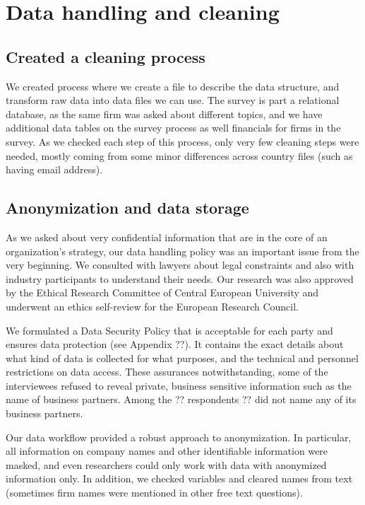 \documentclass[final, dvipsnames, authoryear,12pt]{elsarticle}
\begin{document}
\section{Data handling and cleaning}

\subsection{Created a cleaning process}

We created process where we create a file to describe the data structure, and transform raw data into data files we can use. The survey is part a relational database, as the same firm was asked about different topics, and we have additional data tables on the survey process as well financials for firms in the survey. As we checked each step of this process, only very few cleaning steps were needed, mostly coming from some minor differences across country files (such as having email address). 

\subsection{Anonymization and data storage} 
As we asked about very confidential information that are in the core of an organization’s strategy, our data handling policy was an important issue from the very beginning. We consulted with lawyers about legal constraints and also with industry participants to understand their needs. Our research was also approved by the Ethical Research Committee of Central European University and underwent an ethics self-review for the European Research Council.

We formulated a Data Security Policy that is acceptable for each party and ensures data protection (see Appendix ??). It contains the exact details about what kind of data is collected for what purposes, and the technical and personnel restrictions on data access. These assurances notwithstanding, some of the interviewees refused to reveal private, business sensitive information such as the name of business partners. Among the ?? respondents ?? did not name any of its business partners.

Our data workflow provided a robust approach to anonymization. In particular, all information on company names and other identifiable information were masked, and even researchers could only work with data with anonymized  information only. In addition, we checked variables and cleared names from text (sometimes firm names were mentioned in other free text questions).
\end{document}
